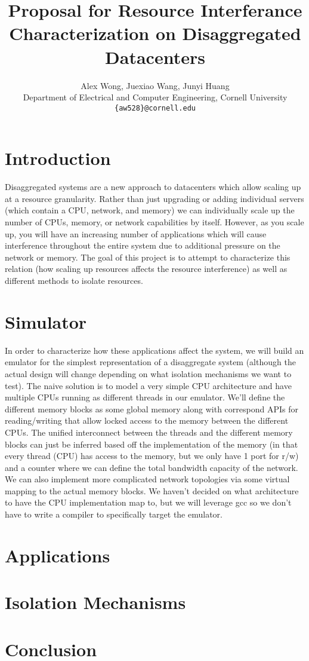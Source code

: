 \documentclass{article}
\title{Proposal for Resource Interferance Characterization on Disaggregated Datacenters}
\author{
    \vspace{6px}
    Alex Wong, Juexiao Wang, Junyi Huang \\
    Department of Electrical and Computer Engineering, Cornell University \\
    \texttt{\{aw528\}@cornell.edu}
}
\let\ACMmaketitle=\maketitle
\renewcommand{\maketitle}{\begingroup\let\footnote=\thanks\ACMmaketitle\endgroup}
\begin{document}
\maketitle

\onehalfspacing

\section{Introduction}
Disaggregated systems are a new approach to datacenters which allow scaling up at a resource granularity. Rather than just upgrading or adding individual servers (which contain a CPU, network, and memory) we can individually scale up the number of CPUs, memory, or network capabilities by itself. However, as you scale up, you will have an increasing number of applications which will cause interference throughout the entire system due to additional pressure on the network or memory. The goal of this project is to attempt to characterize this relation (how scaling up resources affects the resource interference) as well as different methods to isolate resources.

\section{Simulator}
In order to characterize how these applications affect the system, we will build an emulator for the simplest representation of a disaggregate system (although the actual design will change depending on what isolation mechanisms we want to test). The naive solution is to model a very simple CPU architecture and have multiple CPUs running as different threads in our emulator. We'll define the different memory blocks as some global memory along with correspond APIs for reading/writing that allow locked access to the memory between the different CPUs. The unified interconnect between the threads and the different memory blocks can just be inferred based off the implementation of the memory (in that every thread (CPU) has access to the memory, but we only have 1 port for r/w) and a counter where we can define the total bandwidth capacity of the network. We can also implement more complicated network topologies via some virtual mapping to the actual memory blocks. We haven't decided on what architecture to have the CPU implementation map to, but we will leverage gcc so we don't have to write a compiler to specifically target the emulator.

\section{Applications}

\section{Isolation Mechanisms}

\section{Conclusion}
\end{document}
